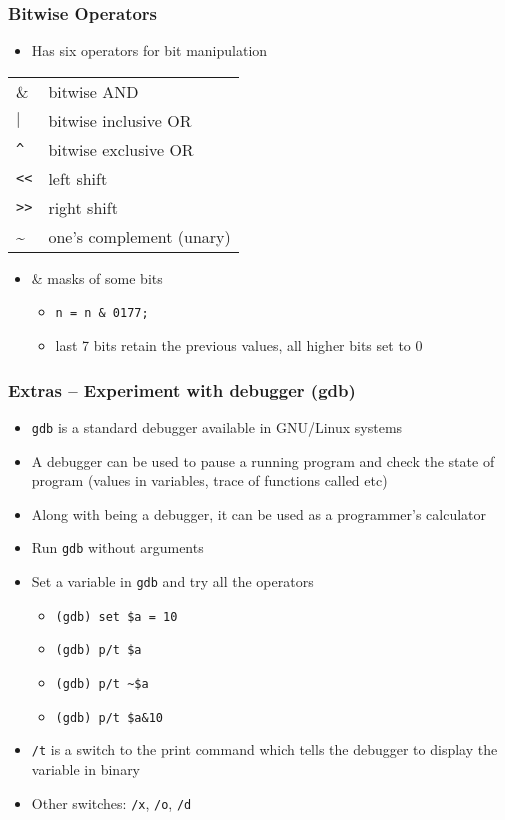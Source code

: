 \documentclass[11pt]{beamer}
\begin{document}
\begin{frame}[fragile]\frametitle{Bitwise Operators}
\label{sec-1-20}

\begin{itemize}
\item Has six operators for bit manipulation
\end{itemize}

\begin{center}
\begin{tabular}{|l|l|}
 \&         &  bitwise AND               \\
 $\vert$    &  bitwise inclusive OR      \\
 \verb~^~   &  bitwise exclusive OR      \\
 \verb~<<~  &  left shift                \\
 \verb~>>~  &  right shift               \\
 \~{}       &  one's complement (unary)  \\
\end{tabular}
\end{center}


\begin{itemize}
\item \& masks of some bits
\begin{itemize}
\item \verb~n = n & 0177;~
\item last 7 bits retain the previous values, all higher bits set to 0
\end{itemize}
\end{itemize}
\end{frame}
\begin{frame}[fragile]\frametitle{Extras -- Experiment with debugger (gdb)}
\label{sec-1-21}

\begin{itemize}
\item \verb~gdb~ is a standard debugger available in GNU/Linux systems
\item A debugger can be used to pause a running program and check the state of program (values in variables, trace of functions called etc)
\item Along with being a debugger, it can be used as a programmer's calculator
\item Run \verb~gdb~ without arguments
\item Set a variable in \verb~gdb~ and try all the operators
\begin{itemize}
\item \verb~(gdb) set $a = 10~
\item \verb~(gdb) p/t $a~
\item \verb,(gdb) p/t ~$a,
\item \verb~(gdb) p/t $a&10~
\end{itemize}
\item \verb~/t~ is a switch to the print command which tells the debugger to display the variable in binary
\item Other switches: \verb~/x~, \verb~/o~, \verb~/d~
\end{itemize}
\end{frame}
\end{document}
